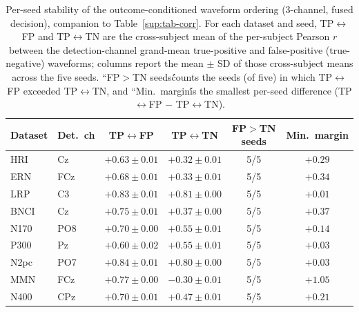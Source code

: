\begin{table}[t]
\centering
\setlength{\tabcolsep}{6pt}
\caption{Per-seed stability of the outcome-conditioned waveform ordering (3-channel, fused decision), companion to Table~\ref{sup:tab-corr}. For each dataset and seed, TP$\leftrightarrow$FP and TP$\leftrightarrow$TN are the cross-subject mean of the per-subject Pearson $r$ between the detection-channel grand-mean true-positive and false-positive (true-negative) waveforms; columns report the mean $\pm$ SD of those cross-subject means across the five seeds. ``FP$>$TN seeds\'\' counts the seeds (of five) in which TP$\leftrightarrow$FP exceeded TP$\leftrightarrow$TN, and ``Min.\ margin\'\' is the smallest per-seed difference (TP$\leftrightarrow$FP $-$ TP$\leftrightarrow$TN).}
\label{sup:tab-corr-perseed}
\begin{tabular}{llcccc}
\toprule
Dataset & Det.\ ch & TP$\leftrightarrow$FP & TP$\leftrightarrow$TN & FP$>$TN seeds & Min.\ margin \\
\midrule
HRI & Cz & $+0.63 \pm 0.01$ & $+0.32 \pm 0.01$ & 5/5 & $+0.29$ \\
ERN & FCz & $+0.68 \pm 0.01$ & $+0.33 \pm 0.01$ & 5/5 & $+0.34$ \\
LRP & C3 & $+0.83 \pm 0.01$ & $+0.81 \pm 0.00$ & 5/5 & $+0.01$ \\
BNCI & Cz & $+0.75 \pm 0.01$ & $+0.37 \pm 0.00$ & 5/5 & $+0.37$ \\
N170 & PO8 & $+0.70 \pm 0.00$ & $+0.55 \pm 0.01$ & 5/5 & $+0.14$ \\
P300 & Pz & $+0.60 \pm 0.02$ & $+0.55 \pm 0.01$ & 5/5 & $+0.03$ \\
N2pc & PO7 & $+0.84 \pm 0.01$ & $+0.80 \pm 0.00$ & 5/5 & $+0.03$ \\
MMN & FCz & $+0.77 \pm 0.00$ & $-0.30 \pm 0.01$ & 5/5 & $+1.05$ \\
N400 & CPz & $+0.70 \pm 0.01$ & $+0.47 \pm 0.01$ & 5/5 & $+0.21$ \\
\bottomrule
\end{tabular}
\end{table}
